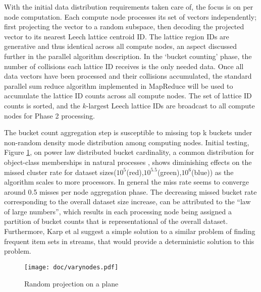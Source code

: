 \documentclass[a4paper,10pt]{article}
\begin{document}
With the initial data distribution requirements taken care of,
the focus is on per node computation.  Each compute node processes
its set of vectors independently; first projecting the vector to a random 
subspace,
then decoding the projected vector to its nearest Leech lattice centroid ID.  
The lattice region
IDs are generative and thus identical across all compute nodes, an aspect 
discussed further in the parallel algorithm description.  In the
`bucket counting' phase, the number of collisions each lattice ID receives
is the only needed data.  Once all data vectors have been processed and
their collisions accumulated, the standard parallel sum reduce algorithm
implemented in MapReduce will be used to accumulate the lattice ID counts across all
compute nodes.	The set of lattice ID counts is sorted, and the $k$-largest
Leech lattice IDs are broadcast to all compute nodes for Phase 2 processing.

The bucket count aggregation step is susceptible to missing top k buckets
under non-random density mode distribution among computing nodes.  Initial
testing, Figure \ref{reduxcounts}, on power law distributed bucket cardinality, 
a common distribution for object-class memberships in natural processes
\cite{reed2002}, shows diminishing effects on the missed cluster rate for 
dataset sizes($10^5$(red),$10^{5.5}$(green),$10^6$(blue)) as the algorithm
scales to more processors. In general the miss rate seems to converge around
0.5 misses per node aggregation phase. The decreasing missed bucket rate corresponding to
the overall dataset size increase, can be attributed to the ``law of large 
numbers'', which results in each processing node being assigned a partition of
bucket counts that is representational of the overall dataset. Furthermore,
Karp et al\cite{Karp} suggest a simple solution to a similar problem of finding
frequent item sets in streams, that would provide a deterministic solution to this
problem.

\begin{figure}%
\centering
\texttt{[image: doc/varynodes.pdf]}
\caption{Random projection on a plane\label{reduxcounts}}
\end{figure}
\end{document}
